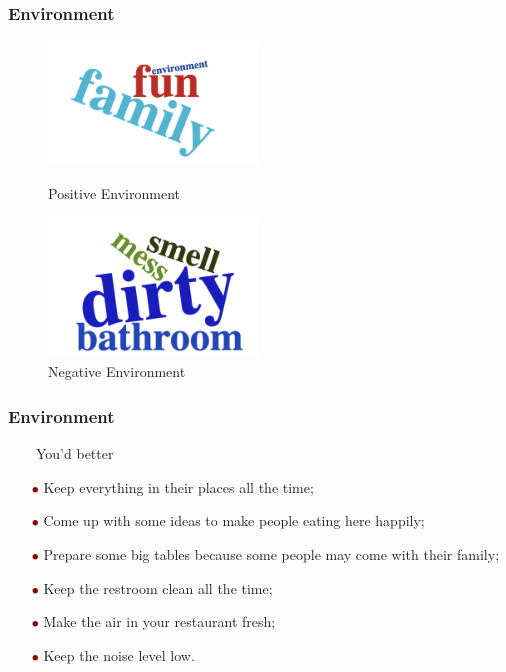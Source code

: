 \documentclass[notheorems, aspectratio=54]{beamer}
\renewcommand\textbullet{\ensuremath{\bullet}}
\begin{document}
\begin{frame}
\frametitle{Environment}
\begin{figure}
	\begin{minipage}[t]{0.5\linewidth}
		\centering
		\includegraphics[width=2.2in]{environment_good.png}
		\caption{Positive Environment}
		\label{fig:side:a}
	\end{minipage}%
	\begin{minipage}[t]{0.5\linewidth}
		\centering
		\includegraphics[width=2.2in]{environment_bad.png}
		\caption{Negative Environment}
		\label{fig:side:b}
	\end{minipage}
\end{figure}
\end{frame}

\begin{frame}
\frametitle{Environment}
\ \ \ \ You'd better
\begin{itemize}
	\item[\textcolor{darkred}{\textbullet}] Keep everything in their places all the time;
	\item[\textcolor{darkred}{\textbullet}] Come up with some ideas to make people eating here happily;
	\item[\textcolor{darkred}{\textbullet}] Prepare some big tables because some people may come with their family;
	\item[\textcolor{darkred}{\textbullet}] Keep the restroom clean all the time;
	\item[\textcolor{darkred}{\textbullet}] Make the air in your restaurant fresh;
	\item[\textcolor{darkred}{\textbullet}] Keep the noise level low.
\end{itemize}

\end{frame}
\end{document}
